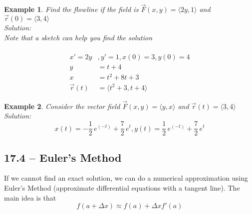 \documentclass[11pt]{article}
\newtheorem{ex}{Example}
\begin{document}
\begin{ex}
  Find the flowline if the field is $\vec{F}(x,y) = \langle 2y, 1 \rangle$
  and $\vec{r}(0) = \langle 3, 4 \rangle$ \\
  Solution:\\
  Note that a sketch can help you find the solution\\
\\
  \begin{align*}
    x' = 2y &, y' = 1, x(0) = 3, y(0) = 4 \\
    y &= t +  4\\
    x &= t^{2}  + 8t +  3\\
    \vec{r}(t) &= \langle t^{2} + 3, t  + 4\rangle
  \end{align*}
\end{ex}
\begin{ex}
  Consider the vector field $\vec{F}(x,y) = \langle y, x \rangle$ and $\vec{r}(t) = \langle 3, 4 \rangle$
  Solution: \\
  \[x\left(t\right) = -\frac{1}{2} \, e^{\left(-t\right)} + \frac{7}{2} \, e^{t}, y\left(t\right) = \frac{1}{2} \, e^{\left(-t\right)} + \frac{7}{2} \, e^{t}
\]
\end{ex}
\subsection{17.4 -- Euler's Method}
If we cannot find an exact solution, we can do a numerical approximation using Euler's Method (approximate differential equations with a tangent line).
The main idea is that
\[f(a + \Delta x) \approx f(a) + \Delta x f'(a)\]
\end{document}
